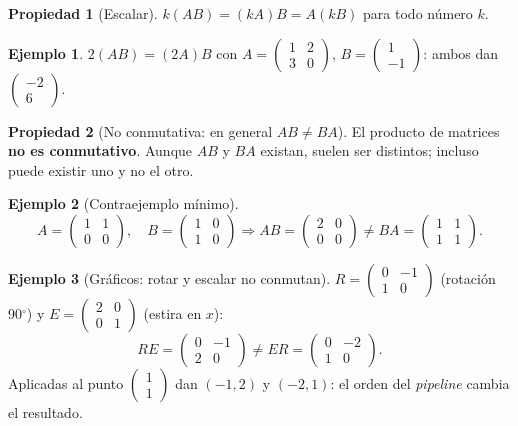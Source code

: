 \documentclass[a4paper,12pt]{article}
\theoremstyle{definition}
\newtheorem{ejemplo}{Ejemplo}[section]
\newtheorem{propiedad}{Propiedad}[section]
\begin{document}
\begin{propiedad}[Escalar]
$k(AB) = (kA)B = A(kB)$ para todo n\'umero $k$.
\end{propiedad}
\begin{ejemplo}
$2(AB) = (2A)B$ con $A=\begin{pmatrix} 1 & 2 \\ 3 & 0 \end{pmatrix}$, $B=\begin{pmatrix} 1 \\ -1 \end{pmatrix}$: ambos dan $\begin{pmatrix} -2 \\ 6 \end{pmatrix}$.
\end{ejemplo}

\begin{propiedad}[No conmutativa: en general $AB \neq BA$]
El producto de matrices \textbf{no es conmutativo}. Aunque $AB$ y $BA$ existan, suelen ser distintos; incluso puede existir uno y no el otro.
\end{propiedad}
\begin{ejemplo}[Contraejemplo m\'inimo]
\[
A=\begin{pmatrix} 1 & 1 \\ 0 & 0 \end{pmatrix}, \quad B=\begin{pmatrix} 1 & 0 \\ 1 & 0 \end{pmatrix} \Rightarrow AB=\begin{pmatrix} 2 & 0 \\ 0 & 0 \end{pmatrix} \neq BA=\begin{pmatrix} 1 & 1 \\ 1 & 1 \end{pmatrix}.
\]
\end{ejemplo}

\begin{ejemplo}[Gr\'aficos: rotar y escalar no conmutan]
$R=\begin{pmatrix} 0 & -1 \\ 1 & 0 \end{pmatrix}$ (rotaci\'on 90$^\circ$) y $E=\begin{pmatrix} 2 & 0 \\ 0 & 1 \end{pmatrix}$ (estira en $x$):
\[
RE=\begin{pmatrix} 0 & -1 \\ 2 & 0 \end{pmatrix} \neq ER=\begin{pmatrix} 0 & -2 \\ 1 & 0 \end{pmatrix}.
\]
Aplicadas al punto $\begin{pmatrix} 1 \\ 1 \end{pmatrix}$ dan $(-1,2)$ y $(-2,1)$: el orden del \textit{pipeline} cambia el resultado.
\end{ejemplo}
\end{document}

